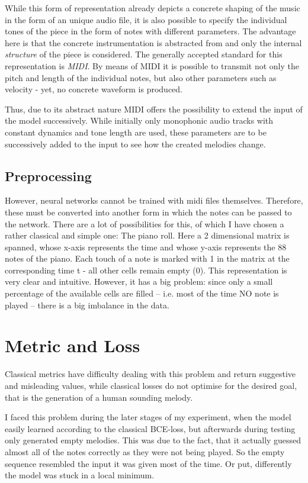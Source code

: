 \documentclass[a4paper, 10pt, xcolor=dvipsnames]{article} %
\begin{document}
While this form of representation already depicts a concrete shaping of the
music in the form of an unique audio file, it is also possible to specify the
individual tones of the piece in the form of notes with different parameters.
The advantage here is that the concrete instrumentation is abstracted from and
only the internal \emph{structure} of the piece is considered. The generally
accepted standard for this representation is \emph{MIDI}. By means of MIDI it
is possible to transmit not only the pitch and length of the individual notes,
but also other parameters such as velocity - yet, no concrete waveform is
produced.

Thus, due to its abstract nature MIDI offers the possibility to extend the
input of the model successively. While initially only monophonic audio tracks
with constant dynamics and tone length are used, these parameters are to be
successively added to the input to see how the created melodies change.

\subsection{Preprocessing}
However, neural networks cannot be trained with midi files themselves.
Therefore, these must be converted into another form in which the notes can be
passed to the network. There are a lot of possibilities for this, of which I
have chosen a rather classical and simple one: The piano roll. Here a 2
dimensional matrix is spanned, whose x-axis represents the time and whose
y-axis represents the 88 notes of the piano. Each touch of a note is marked
with 1 in the matrix at the corresponding time t - all other cells remain empty
(0). This representation is very clear and intuitive. However, it has a big
problem: since only a small percentage of the available cells are filled --
i.e. most of the time NO note is played -- there is a big imbalance in the
data.

\section{Metric and Loss}
Classical metrics have difficulty dealing with this problem and return
suggestive and misleading values, while classical losses do not optimise for
the desired goal, that is the generation of a human sounding melody.

I faced this problem during the later stages of my experiment, when the model
easily learned according to the classical BCE-loss, but afterwards during
testing only generated empty melodies. This was due to the fact, that it
actually guessed almost all of the notes correctly as they were not being
played. So the empty sequence resembled the input it was given most of the
time. Or put, differently the model was stuck in a local minimum.
\end{document}

